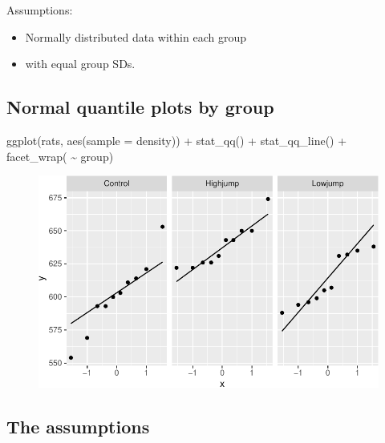 \documentclass[
  letterpaper,
  DIV=11,
  numbers=noendperiod]{scrartcl}
\newenvironment{Shaded}{\begin{snugshade}}{\end{snugshade}}
\newcommand{\AttributeTok}[1]{\textcolor[rgb]{0.40,0.45,0.13}{#1}}
\newcommand{\FunctionTok}[1]{\textcolor[rgb]{0.28,0.35,0.67}{#1}}
\newcommand{\NormalTok}[1]{\textcolor[rgb]{0.00,0.23,0.31}{#1}}
\newcommand{\SpecialCharTok}[1]{\textcolor[rgb]{0.37,0.37,0.37}{#1}}
\providecommand{\tightlist}{%
  \setlength{\itemsep}{0pt}\setlength{\parskip}{0pt}}\usepackage{longtable,booktabs,array}
\begin{document}
Assumptions:

\begin{itemize}
\tightlist
\item
  Normally distributed data within each group
\item
  with equal group SDs.
\end{itemize}

\hypertarget{normal-quantile-plots-by-group}{%
\subsection{Normal quantile plots by
group}\label{normal-quantile-plots-by-group}}

\begin{Shaded}
\begin{Highlighting}[]
\FunctionTok{ggplot}\NormalTok{(rats, }\FunctionTok{aes}\NormalTok{(}\AttributeTok{sample =}\NormalTok{ density)) }\SpecialCharTok{+} \FunctionTok{stat\_qq}\NormalTok{() }\SpecialCharTok{+} 
  \FunctionTok{stat\_qq\_line}\NormalTok{() }\SpecialCharTok{+} \FunctionTok{facet\_wrap}\NormalTok{( }\SpecialCharTok{\textasciitilde{}}\NormalTok{ group)}
\end{Highlighting}
\end{Shaded}

\begin{figure}[H]

{\centering \includegraphics{inference_5_files/figure-pdf/inference-5-R-22-1.pdf}

}

\end{figure}

\hypertarget{the-assumptions}{%
\subsection{The assumptions}\label{the-assumptions}}
\end{document}
